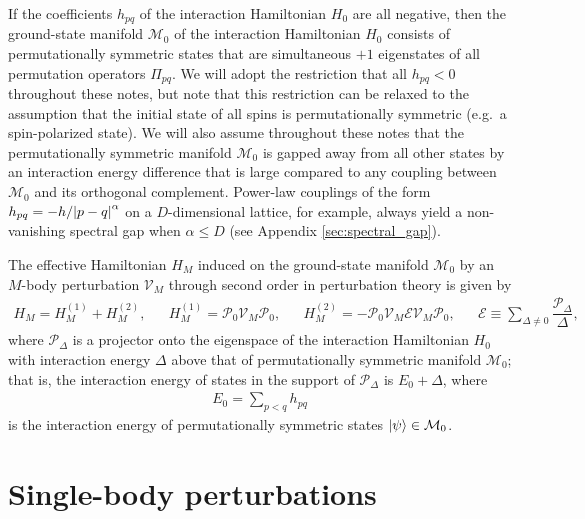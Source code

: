 \documentclass[nofootinbib,notitlepage,11pt]{revtex4-2}
\newcommand{\f}[2]{\dfrac{#1}{#2}} %
\newcommand{\1}{\mathds{1}}
\newcommand{\E}{\mathcal{E}}
\newcommand{\M}{\mathcal{M}}
\renewcommand{\P}{\mathcal{P}}
\newcommand{\V}{\mathcal{V}}
\begin{document}
If the coefficients $h_{pq}$ of the interaction Hamiltonian $H_0$ are
all negative, then the ground-state manifold $\M_0$ of the interaction
Hamiltonian $H_0$ consists of permutationally symmetric states that
are simultaneous $+1$ eigenstates of all permutation operators
$\Pi_{pq}$.  We will adopt the restriction that all $h_{pq}<0$
throughout these notes, but note that this restriction can be relaxed
to the assumption that the initial state of all spins is
permutationally symmetric (e.g.~a spin-polarized state).  We will also
assume throughout these notes that the permutationally symmetric
manifold $\M_0$ is gapped away from all other states by an interaction
energy difference that is large compared to any coupling between
$\M_0$ and its orthogonal complement.  Power-law couplings of the form
$h_{pq}=-h/\abs{p-q}^\alpha$ on a $D$-dimensional lattice, for
example, always yield a non-vanishing spectral gap when $\alpha\le D$
(see Appendix \ref{sec:spectral_gap}).

The effective Hamiltonian $H_M$ induced on the ground-state manifold
$\M_0$ by an $M$-body perturbation $\V_M$ through second order in
perturbation theory is given by\cite{bravyi2011schrieffer,
  perlin2019effective}
\begin{align}
  H_M = H_M^{(1)} + H_M^{(2)},
  &&
  H_M^{(1)} = \P_0 \V_M \P_0,
  &&
  H_M^{(2)} = - \P_0 \V_M \E \V_M \P_0,
  &&
  \E \equiv \sum_{\Delta\ne0} \f{\P_\Delta}{\Delta},
  \label{eq:H_M}
\end{align}
where $\P_\Delta$ is a projector onto the eigenspace of the
interaction Hamiltonian $H_0$ with interaction energy $\Delta$ above
that of permutationally symmetric manifold $\M_0$; that is, the
interaction energy of states in the support of $\P_\Delta$ is
$E_0+\Delta$, where
\begin{align}
  E_0 = \sum_{p<q} h_{pq}
\end{align}
is the interaction energy of permutationally symmetric states
$\ket\psi\in\M_0$.

\section{Single-body perturbations}
\label{sec:single_body_pert}
\end{document}

